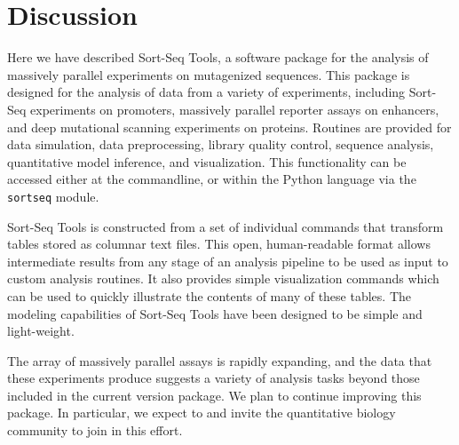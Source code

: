 \documentclass{bmcart}
\begin{document}
%
%
%

\section*{Discussion}

Here we have described Sort-Seq Tools, a software package for the analysis of massively parallel experiments on  mutagenized sequences. This package is designed for the analysis of data from a variety of experiments, including Sort-Seq experiments on promoters, massively parallel reporter assays on enhancers, and deep mutational scanning experiments on proteins. Routines are provided for data simulation, data preprocessing, library quality control, sequence analysis, quantitative model inference, and visualization. This functionality can be accessed either at the commandline, or within the Python language via the \texttt{sortseq} module.

Sort-Seq Tools is constructed from a set of individual commands that transform tables stored as columnar text files. This open, human-readable format allows intermediate results from any stage of an analysis pipeline to be used as input to custom analysis routines. It also provides simple visualization commands which can be used to quickly illustrate the contents of many of these tables. The modeling capabilities of Sort-Seq Tools have been designed to be simple and light-weight. 

The array of massively parallel assays is rapidly expanding, and the data that these experiments produce suggests a variety of analysis tasks beyond those included in the current version package. We plan to continue improving this package. In particular, we expect to and invite the quantitative biology community to join in this effort. 
\end{document}
